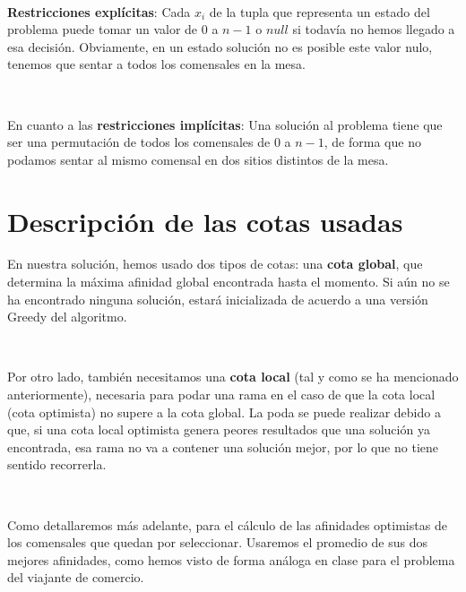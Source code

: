 \documentclass{article}
\begin{document}
	\
	
	\textbf{Restricciones explícitas}: Cada $x_i$ de la tupla que representa un estado del problema puede tomar un valor de $0$ a $n-1$ o $null$ si todavía no hemos llegado a esa decisión. Obviamente, en un estado solución no es posible este valor nulo, tenemos que sentar a todos los comensales en la mesa.

	\
	
	En cuanto a las \textbf{restricciones implícitas}: Una solución al problema tiene que ser una permutación de todos los comensales de $0$ a $n-1$, de forma que no podamos sentar al mismo comensal en dos sitios distintos de la mesa.
	
	\section{Descripción de las cotas usadas}
	En nuestra solución, hemos usado dos tipos de cotas: una \textbf{cota global}, que determina la máxima afinidad global encontrada hasta el momento. Si aún no se ha encontrado ninguna solución, estará inicializada de acuerdo a una versión Greedy del algoritmo. 
	
	\
	
	Por otro lado, también necesitamos una \textbf{cota local} (tal y como se ha mencionado anteriormente), necesaria para podar una rama en el caso de que la cota local (cota optimista) no supere a la cota global. La poda se puede realizar debido a que, si una cota local optimista genera peores resultados que una solución ya encontrada, esa rama no va a contener una solución mejor, por lo que no tiene sentido recorrerla.
	
	\
	
	Como detallaremos más adelante, para el cálculo de las afinidades optimistas de los comensales que quedan por seleccionar. Usaremos el promedio de sus dos mejores afinidades, como hemos visto de forma análoga en clase para el problema del viajante de comercio.
	
\end{document}
